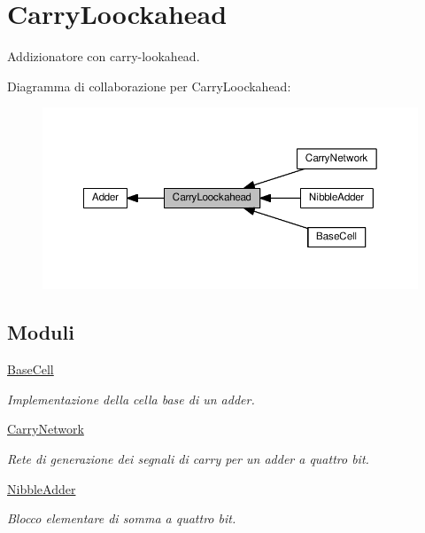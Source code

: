 \hypertarget{group___carry_loockahead}{}\section{Carry\+Loockahead}
\label{group___carry_loockahead}


Addizionatore con carry-\/lookahead.  


Diagramma di collaborazione per Carry\+Loockahead\+:\nopagebreak
\begin{figure}[H]
\begin{center}
\leavevmode
\includegraphics[width=350pt]{group___carry_loockahead}
\end{center}
\end{figure}
\subsection*{Moduli}
\begin{DoxyCompactItemize}
\item 
\hyperlink{group___base_cell}{Base\+Cell}
\begin{DoxyCompactList}\small\item\em Implementazione della cella base di un adder. \end{DoxyCompactList}\item 
\hyperlink{group___carry_network}{Carry\+Network}
\begin{DoxyCompactList}\small\item\em Rete di generazione dei segnali di carry per un adder a quattro bit. \end{DoxyCompactList}\item 
\hyperlink{group___nibble_adder}{Nibble\+Adder}
\begin{DoxyCompactList}\small\item\em Blocco elementare di somma a quattro bit. \end{DoxyCompactList}\end{DoxyCompactItemize}
